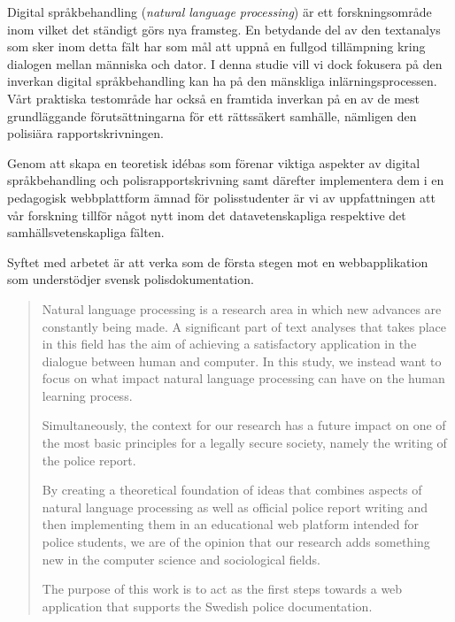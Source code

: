 \documentclass[swedish]{maucsthesis}
\begin{document}

\author{Kalle Lindqvist \and Henrik Svensson}

\subject{datavetenskap}


\maketitle %

\begin{sammanfattning}
  Digital språkbehandling (\textit{natural language processing}) är ett forskningsområde inom vilket det ständigt görs nya framsteg. En
  betydande del av den textanalys som sker inom detta fält har som mål att
  uppnå en fullgod tillämpning kring dialogen mellan människa och dator. I denna
  studie vill vi dock fokusera på den inverkan digital språkbehandling kan ha på den
  mänskliga inlärningsprocessen. Vårt praktiska testområde har också en
  framtida inverkan på en av de mest grundläggande förutsättningarna för ett
  rättssäkert samhälle, nämligen den polisiära rapportskrivningen.

  Genom att skapa en teoretisk idébas som förenar viktiga aspekter av
  digital språkbehandling och polisrapportskrivning samt därefter
  implementera dem i en pedagogisk webbplattform ämnad för polisstudenter är vi
  av uppfattningen att vår forskning tillför något nytt inom det
  datavetenskapliga respektive det samhällsvetenskapliga fälten.

  Syftet med arbetet är att verka som de första stegen mot en webbapplikation
  som understödjer svensk polisdokumentation.
\end{sammanfattning} 
\begin{abstract}
  Natural language processing is a research area in which new advances are
  constantly being made. A significant part of text analyses that takes place in
  this field has the aim of achieving a satisfactory application in the dialogue
  between human and computer. In this study, we instead want to focus on what
  impact natural language processing can have on the human learning process.

  Simultaneously, the context for our research has a future impact on one of
  the most basic principles for a legally secure society, namely the writing of
  the police report.

  By creating a theoretical foundation of ideas that combines aspects of natural
  language processing as well as official police report writing and then
  implementing them in an educational web platform intended for police students,
  we are of the opinion that our research adds something new in the computer
  science and sociological fields.

  The purpose of this work is to act as the first steps towards a web
  application that supports the Swedish police documentation.
\end{abstract}
\end{document}

